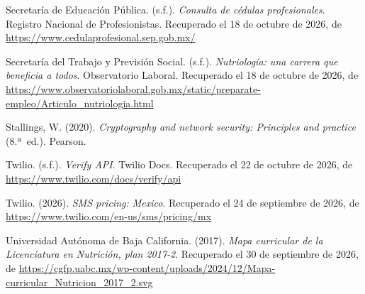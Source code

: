 \documentclass[12pt, a4paper]{article}
\begin{document}
\begin{list}{}{\setlength{\leftmargin}{1.27cm}\setlength{\itemindent}{-1.27cm}%
  \setlength{\labelwidth}{0pt}\setlength{\labelsep}{0pt}\setlength{\itemsep}{6pt}}

\item Secretaría de Educación Pública. (s.f.). \textit{Consulta de
  cédulas profesionales}. Registro Nacional de Profesionistas.
  Recuperado el 18 de octubre de 2026, de \url{https://www.cedulaprofesional.sep.gob.mx/}
 

\item Secretaría del Trabajo y Previsión Social. (s.f.).
  \textit{Nutriología: una carrera que beneficia a todos}. Observatorio
Laboral. Recuperado el 18 de octubre de 2026, de \url{https://www.observatoriolaboral.gob.mx/static/preparate-empleo/Articulo_nutriologia.html}

 
\item Stallings, W. (2020). \textit{Cryptography and network
  security: Principles and practice} (8.ª~ed.). Pearson.

 
\item Twilio. (s.f.). \textit{Verify API}. Twilio Docs. Recuperado el 22 de octubre de 2026, de \url{https://www.twilio.com/docs/verify/api}
 
 
\item Twilio. (2026). \textit{SMS pricing: Mexico}. Recuperado el 24 de
  septiembre de 2026, de \url{https://www.twilio.com/en-us/sms/pricing/mx}
 
  
\item Universidad Autónoma de Baja California. (2017). \textit{Mapa curricular
  de la Licenciatura en Nutrición, plan 2017-2}.
  Recuperado el 30 de septiembre de 2026, de \url{https://cgfp.uabc.mx/wp-content/uploads/2024/12/Mapa-curricular_Nutricion_2017_2.svg}
 

\end{list}
\end{document}
